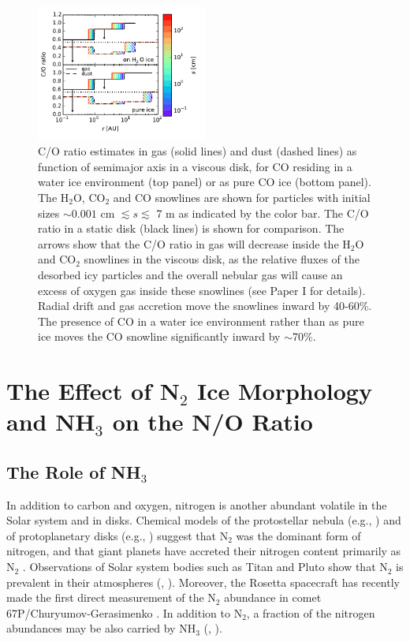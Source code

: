 \documentclass[apj]{emulateapj}
\begin{document}
\begin{figure}[h!]
\centering
\includegraphics[width=0.5\textwidth]{../../figs/C_O_water_ice.pdf}
\caption{C/O ratio estimates in gas (solid lines) and dust (dashed lines) as function of semimajor axis in a viscous disk, for CO residing in a water ice environment (top panel) or as pure CO ice (bottom panel). The H$_2$O, CO$_2$ and CO snowlines are shown for particles with initial sizes $\sim0.001$ cm $\lesssim s \lesssim$ 7 m as indicated by the color bar. The C/O ratio in a static disk (black lines) is shown for comparison. The arrows show that the C/O ratio in gas will decrease inside the H$_2$O and CO$_2$
snowlines in the viscous disk, as the relative fluxes of the desorbed icy
particles and the overall nebular gas will cause an excess of oxygen gas inside these snowlines (see Paper I for details). Radial drift and gas accretion move the snowlines inward by 40-60\%. The presence of CO in a water ice environment rather than as pure ice moves the CO snowline significantly inward by $\sim$70\%.} 
\label{fig:CO_ratio}
\end{figure}

\section{The Effect of N$_2$ Ice Morphology and NH$_3$ on the N/O Ratio}
\label{sec:N}

\subsection{The Role of NH$_3$}

In addition to carbon and oxygen, nitrogen is another abundant volatile in the Solar system and in disks. Chemical models of the protostellar nebula (e.g., \citealt{owen01}) and of protoplanetary disks (e.g., \citealt{rodgers02}) suggest that N$_2$ was the dominant form of nitrogen, and that giant planets have accreted their nitrogen content primarily as N$_2$ \citep{mousis14}. Observations of Solar system bodies such as Titan and Pluto show that N$_2$ is prevalent in their atmospheres (\citealt{cruikshank93}, \citealt{owen93}).  Moreover, the Rosetta spacecraft has recently made the first direct measurement of the N$_2$ abundance in comet 67P/Churyumov-Gerasimenko \citep{rubin15}. In addition to N$_2$, a fraction of the nitrogen abundances may be also carried by NH$_3$ (\citealt{bottinelli10}, \citealt{mumma11}). 
\end{document}
